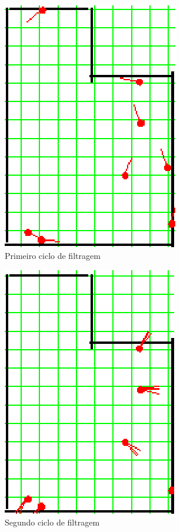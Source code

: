 \begin{figure}[H]
  \centering
  \includegraphics[scale=1]{figuras/cen1_ex5/2.eps}
  \caption[Primeiro Ciclo de Filtragem]{Primeiro ciclo de filtragem}
  \label{img:cen1_ex5_2}
\end{figure}

\begin{figure}[H]
  \centering
  \includegraphics[scale=1]{figuras/cen1_ex5/3.eps}
  \caption[Segundo Ciclo de Filtragem]{Segundo ciclo de filtragem}
  \label{img:cen1_ex5_3}
\end{figure}

